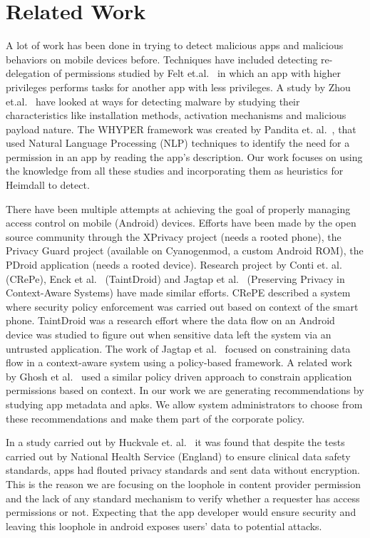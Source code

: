 \section{Related Work}
\label{RelatedWork}
\noindent
A lot of work has been done in trying to detect malicious apps and malicious behaviors on mobile devices before. Techniques have included detecting re-delegation of permissions studied by Felt et.al.~\cite{Felt11permissionReDelegation} in which an app with higher privileges performs tasks for another app with less privileges. A study by Zhou et.al.~\cite{Zhou2012MalwareGenomeProject} have looked at ways for detecting malware by studying their characteristics like installation methods, activation mechanisms and malicious payload nature. The WHYPER framework was created by Pandita et. al.~\cite{Pandita2013Whyper}, that used Natural Language Processing (NLP) techniques to identify the need for a permission in an app by reading the app's description. Our work focuses on using the knowledge from all these studies and incorporating them as heuristics for Heimdall to detect.

There have been multiple attempts at achieving the goal of properly managing access control on mobile (Android) devices. Efforts have been made by the open source community through the XPrivacy project (needs a rooted phone), the Privacy Guard project (available on Cyanogenmod, a custom Android ROM), the PDroid application (needs a rooted device). Research project by Conti et. al.~\cite{conti2011crepe} (CRePe), Enck et al.~\cite{enck2010taintdroid} (TaintDroid) and Jagtap et al.~\cite{Jagtap2011Privacy} (Preserving Privacy in Context-Aware Systems) have made similar efforts. CRePE described a system where security policy enforcement was carried out based on context of the smart phone. TaintDroid was a research effort where the data flow on an Android device was studied to figure out when sensitive data left the system via an untrusted application. The work of Jagtap et al.~\cite{Jagtap2011Privacy} focused on constraining data flow in a context-aware system using a policy-based framework. A related work by Ghosh et al.~\cite{ghosh2012privacy} used a similar policy driven approach to constrain application permissions based on context. In our work we are generating recommendations by studying app metadata and apks. We allow system administrators to choose from these recommendations and make them part of the corporate policy.

In a study carried out by Huckvale et. al.~\cite{raey} it was found that despite the tests carried out by National Health Service (England) to ensure clinical data safety standards, apps had flouted privacy standards and sent data without encryption. This is the reason we are focusing on the loophole in content provider permission and the lack of any standard mechanism to verify whether a requester has access permissions or not. Expecting that the app developer would ensure security and leaving this loophole in android exposes users' data to potential attacks.


